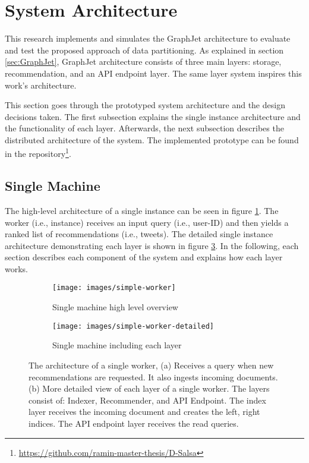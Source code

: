 \section{System Architecture}
\label{sec:system-architecture}

This research implements and simulates the GraphJet architecture to evaluate and test the proposed approach of data partitioning. As explained in section \ref{sec:GraphJet}, GraphJet architecture consists of three main layers: storage, recommendation, and an API endpoint layer. The same layer system inspires this work's architecture. 


This section goes through the prototyped system architecture and the design decisions taken. The first subsection explains the single instance architecture and the functionality of each layer. Afterwards, the next subsection describes the distributed architecture of the system. The implemented prototype can be found in the repository\footnote{\url{https://github.com/ramin-master-thesis/D-Salsa}}.


\subsection{Single Machine}
\label{subsec:single-machine}
The high-level architecture of a single instance can be seen in figure \ref{fig:single-machine-architecture}. The worker (i.e., instance) receives an input query (i.e., user-ID) and then yields a ranked list of recommendations (i.e., tweets). The detailed single instance architecture demonstrating each layer is shown in figure \ref{fig:single-machine-architecture-detailed}. In the following, each section describes each component of the system and explains how each layer works.

\begin{figure}[!htb]
    \centering
    \begin{subfigure}[b]{0.75\textwidth}
       \texttt{[image: images/simple-worker]}
       \caption{Single machine high level overview}
       \label{fig:single-machine-architecture} 
    \end{subfigure}
    
    \begin{subfigure}[b]{0.8\textwidth}
       \texttt{[image: images/simple-worker-detailed]}
       \caption{Single machine including each layer}
       \label{fig:single-machine-architecture-detailed}
    \end{subfigure}
    
    \caption {The architecture of a single worker, (a) Receives a query when new recommendations are requested. It also ingests incoming documents. (b) More detailed view of each layer of a single worker. The layers consist of: Indexer, Recommender, and API Endpoint. The index layer receives the incoming document and creates the left, right indices. The API endpoint layer receives the read queries.}
\end{figure}


